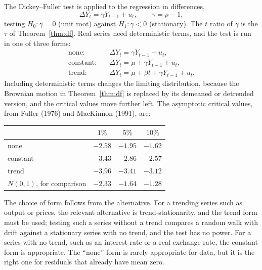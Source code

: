 \documentclass[11pt,a4paper]{article}
\numberwithin{equation}{section}
\theoremstyle{definition}
\begin{document}
The Dickey--Fuller test is applied to the regression in differences,
\[
\Delta Y_t = \gamma Y_{t-1} + u_t, \qquad \gamma = \rho - 1,
\]
testing $H_0\colon\gamma = 0$ (unit root) against $H_1\colon\gamma < 0$ (stationary). The $t$ ratio of $\gamma$ is the $\tau$ of Theorem~\ref{thm:df}. Real series need
deterministic terms, and the test is run in one of three forms:
\begin{align*}
\text{none:}\quad &\Delta Y_t = \gamma Y_{t-1} + u_t,\\
\text{constant:}\quad &\Delta Y_t = \mu + \gamma Y_{t-1} + u_t,\\
\text{trend:}\quad &\Delta Y_t = \mu + \beta t + \gamma Y_{t-1} + u_t .
\end{align*}
Including deterministic terms changes the limiting distribution, because the Brownian motion in Theorem~\ref{thm:df} is replaced by its demeaned or
detrended version, and the critical values move further left. The asymptotic critical values, from Fuller (1976) and MacKinnon (1991), are:
\begin{center}
\renewcommand{\arraystretch}{1.3}
\begin{tabular}{lccc}
\hline
& $1\%$ & $5\%$ & $10\%$\\
\hline
none & $-2.58$ & $-1.95$ & $-1.62$\\
constant & $-3.43$ & $-2.86$ & $-2.57$\\
trend & $-3.96$ & $-3.41$ & $-3.12$\\
\hline
$N(0, 1)$, for comparison & $-2.33$ & $-1.64$ & $-1.28$\\
\hline
\end{tabular}
\end{center}
The choice of form follows from the alternative. For a trending series such as output or prices, the relevant alternative is trend-stationarity,
and the trend form must be used; testing such a series without a trend compares a random walk with drift against a stationary series with no
trend, and the test has no power. For a series with no trend, such as an interest rate or a real exchange rate, the constant form is appropriate.
The ``none'' form is rarely appropriate for data, but it is the right one for residuals that already have mean zero.
\end{document}
